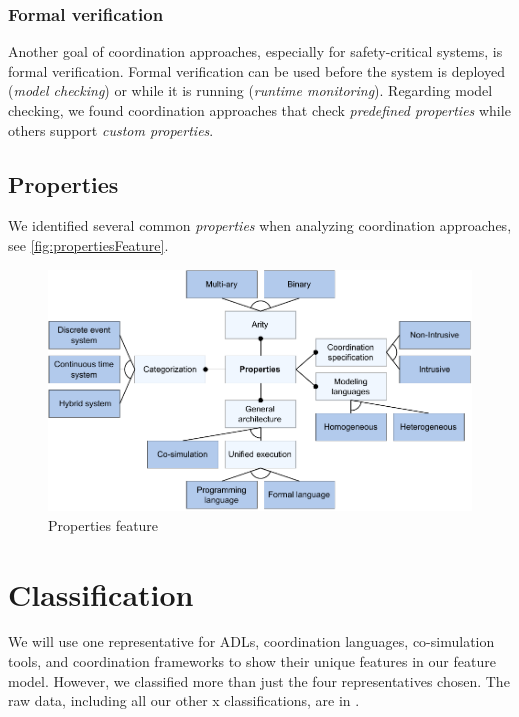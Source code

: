 \documentclass[runningheads]{llncs}
\begin{document}
\subsubsection{Formal verification} Another goal of coordination approaches, especially for safety-critical systems, is formal verification.
Formal verification can be used before the system is deployed (\textit{model checking}) or while it is running (\textit{runtime monitoring}).
Regarding model checking, we found coordination approaches that check \textit{predefined properties} while others support \textit{custom properties}.

\subsection{Properties}
We identified several common \textit{properties} when analyzing coordination approaches, see \autoref{fig:propertiesFeature}.

\begin{figure}[ht]
	\centering
	\includegraphics[width=1\textwidth]{images/properties_feature}
	\caption{Properties feature}
	\label{fig:propertiesFeature}
\end{figure}


\section{Classification} \label{sec:classifications}
We will use one representative for ADLs, coordination languages, co-simulation tools, and coordination frameworks to show their unique features in our feature model.
However, we classified more than just the four representatives chosen.
The raw data, including all our other x classifications, are in \cite{timkrauterArtifactsCoordination2024}.
\end{document}
